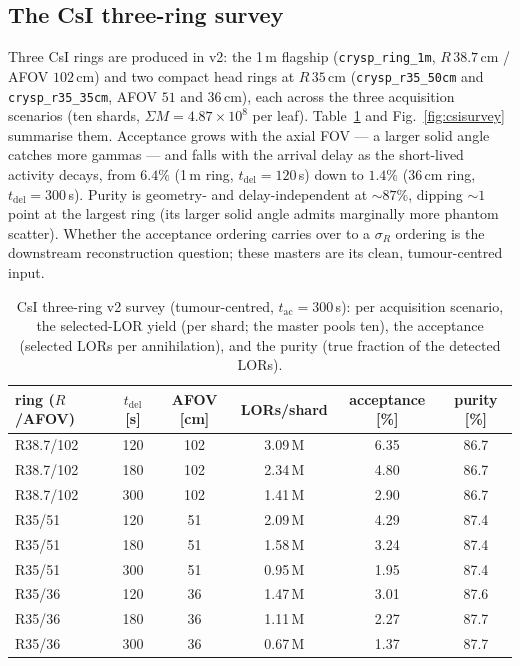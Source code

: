 \documentclass[11pt,a4paper]{article}
\begin{document}
\subsection*{The CsI three-ring survey}

Three CsI rings are produced in v2: the 1\,m flagship (\texttt{crysp\_ring\_1m}, $R\,38.7$\,cm /
AFOV $102$\,cm) and two compact head rings at $R\,35$\,cm (\texttt{crysp\_r35\_50cm} and
\texttt{crysp\_r35\_35cm}, AFOV $51$ and $36$\,cm), each across the three acquisition scenarios (ten
shards, $\Sigma M = 4.87\times10^{8}$ per leaf). Table~\ref{tab:csisurvey} and
Fig.~\ref{fig:csisurvey} summarise them. Acceptance grows with the axial FOV --- a larger solid angle
catches more gammas --- and falls with the arrival delay as the short-lived activity decays, from
$6.4\%$ (1\,m ring, $t_{\mathrm{del}}=120$\,s) down to $1.4\%$ ($36$\,cm ring, $t_{\mathrm{del}}=300$\,s).
Purity is geometry- and delay-independent at ${\sim}87\%$, dipping ${\sim}1$ point at the largest
ring (its larger solid angle admits marginally more phantom scatter). Whether the acceptance ordering
carries over to a $\sigma_R$ ordering is the downstream reconstruction question; these masters are
its clean, tumour-centred input.

\begin{table}[htbp]
\centering
\caption{CsI three-ring v2 survey (tumour-centred, $t_{\mathrm{ac}}=300$\,s): per acquisition
scenario, the selected-LOR yield (per shard; the master pools ten), the acceptance (selected LORs per
annihilation), and the purity (true fraction of the detected LORs).}
\label{tab:csisurvey}
\begin{tabular}{lccccc}
\hline
ring ($R$/AFOV) & $t_{\mathrm{del}}$ [s] & AFOV [cm] & LORs/shard & acceptance [\%] & purity [\%] \\
\hline
R38.7/102 & 120 & 102 & 3.09\,M & 6.35 & 86.7 \\
R38.7/102 & 180 & 102 & 2.34\,M & 4.80 & 86.7 \\
R38.7/102 & 300 & 102 & 1.41\,M & 2.90 & 86.7 \\
\hline
R35/51 & 120 & 51 & 2.09\,M & 4.29 & 87.4 \\
R35/51 & 180 & 51 & 1.58\,M & 3.24 & 87.4 \\
R35/51 & 300 & 51 & 0.95\,M & 1.95 & 87.4 \\
\hline
R35/36 & 120 & 36 & 1.47\,M & 3.01 & 87.6 \\
R35/36 & 180 & 36 & 1.11\,M & 2.27 & 87.7 \\
R35/36 & 300 & 36 & 0.67\,M & 1.37 & 87.7 \\
\hline
\end{tabular}
\end{table}
\end{document}
